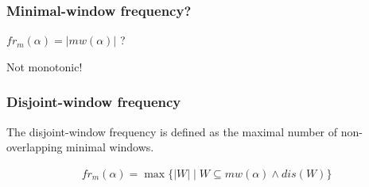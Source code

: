 \documentclass[dvipsnames]{beamer}
\newcommand{\sequencetickmarks}[3]
{
    \pgfmathsetmacro\secondtickmark{#2+0.5}
    \pgfmathsetmacro\lasttickmark{#2+0.5*#1}

    \draw (#2,#3) -- (\lasttickmark,#3);

    \foreach \x in {#2,\secondtickmark,...,\lasttickmark}
        \draw (\x,#3) -- +(0,3pt);
}
\newcommand{\sequenceeventtypes}[4]
{
    \pgfmathsetlengthmacro\nodeheight{(#2)+(.8em)}

    \foreach \t/\eventtype [evaluate=\t as \x using (\t-#3)*0.5+(#1)] in {#4}
    {
        \node [font=\vphantom{$ fbd $}] at (\x,#2) {$ \eventtype $};
        \node (t\t) [inner sep=0] at (\x,\nodeheight) {};
    }
}
\newcommand{\windowthingy}[2]
{
    \pgfmathsetmacro\windowthingylength{#2*0.5-0.1}
    \draw [thick] #1 ++(0,3pt) -- ++(0,-3pt) -- ++(\windowthingylength,0) -- ++(0,3pt);
}
\begin{document}
\begin{frame}
\frametitle{Minimal-window frequency?}

$ fr_m(\alpha) = | mw(\alpha) | $ ?
\pause
\par\bigskip
Not monotonic!

\begin{center}
\end{center}
\begin{center}
\end{center}

\end{frame}
\begin{frame}
\frametitle{Disjoint-window frequency}

The disjoint-window frequency is defined as the maximal number of non-overlapping minimal windows.

\begin{align*}
fr_m(\alpha) = \max\{ | W | \mid W \subseteq mw(\alpha) \wedge dis(W) \}
\end{align*}

\end{frame}
\end{document}
